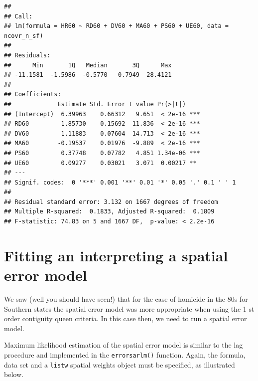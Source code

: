 \documentclass[]{book}
\newenvironment{Shaded}{\begin{snugshade}}{\end{snugshade}}
\newcommand{\CommentTok}[1]{\textcolor[rgb]{0.56,0.35,0.01}{\textit{#1}}}
\newcommand{\DataTypeTok}[1]{\textcolor[rgb]{0.13,0.29,0.53}{#1}}
\newcommand{\DecValTok}[1]{\textcolor[rgb]{0.00,0.00,0.81}{#1}}
\newcommand{\KeywordTok}[1]{\textcolor[rgb]{0.13,0.29,0.53}{\textbf{#1}}}
\newcommand{\NormalTok}[1]{#1}
\newcommand{\OperatorTok}[1]{\textcolor[rgb]{0.81,0.36,0.00}{\textbf{#1}}}
\newcommand{\StringTok}[1]{\textcolor[rgb]{0.31,0.60,0.02}{#1}}
\begin{document}
\begin{verbatim}
## 
## Call:
## lm(formula = HR60 ~ RD60 + DV60 + MA60 + PS60 + UE60, data = ncovr_n_sf)
## 
## Residuals:
##      Min       1Q   Median       3Q      Max 
## -11.1581  -1.5986  -0.5770   0.7949  28.4121 
## 
## Coefficients:
##             Estimate Std. Error t value Pr(>|t|)    
## (Intercept)  6.39963    0.66312   9.651  < 2e-16 ***
## RD60         1.85730    0.15692  11.836  < 2e-16 ***
## DV60         1.11883    0.07604  14.713  < 2e-16 ***
## MA60        -0.19537    0.01976  -9.889  < 2e-16 ***
## PS60         0.37748    0.07782   4.851 1.34e-06 ***
## UE60         0.09277    0.03021   3.071  0.00217 ** 
## ---
## Signif. codes:  0 '***' 0.001 '**' 0.01 '*' 0.05 '.' 0.1 ' ' 1
## 
## Residual standard error: 3.132 on 1667 degrees of freedom
## Multiple R-squared:  0.1833, Adjusted R-squared:  0.1809 
## F-statistic: 74.83 on 5 and 1667 DF,  p-value: < 2.2e-16
\end{verbatim}

\hypertarget{fitting-an-interpreting-a-spatial-error-model}{%
\section{Fitting an interpreting a spatial error model}\label{fitting-an-interpreting-a-spatial-error-model}}

We saw (well you should have seen!) that for the case of homicide in the 80s for Southern states the spatial error model was more appropriate when using the 1 st order contiguity queen criteria. In this case then, we need to run a spatial error model.

Maximum likelihood estimation of the spatial error model is similar to the lag procedure and implemented in the \texttt{errorsarlm()} function. Again, the formula, data set and a \texttt{listw} spatial weights object must be specified, as illustrated below.

\begin{Shaded}
\end{Shaded}
\end{document}
